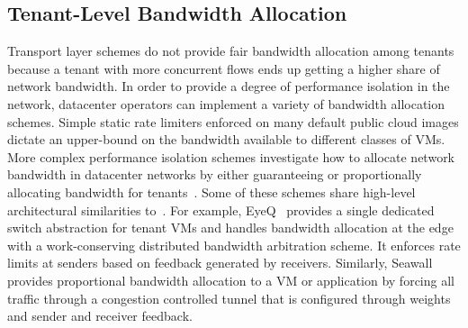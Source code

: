 \subsection{Tenant-Level Bandwidth Allocation}
Transport layer schemes do not
provide fair bandwidth allocation among tenants because
a tenant with more concurrent flows ends up getting
a higher share of network bandwidth.
In order to provide a degree of performance isolation in the network, datacenter operators can implement
a variety of bandwidth allocation schemes. 
Simple static rate limiters enforced on many default public cloud images dictate an upper-bound on the bandwidth available
to different classes of VMs.
More complex performance isolation schemes investigate how to allocate network bandwidth in datacenter
networks by either guaranteeing or proportionally
allocating bandwidth for tenants~\cite{rodrigues2011gatekeeper,Ballani2011oktopus,jeyakumar2013eyeq,shieh2011sharing,
Guo2010Secondnet,Popa2012Faircloud,Xie2012Proteus,Lam2012NetShare,jang2015silo}. 
Some of these schemes share high-level architectural similarities to~\acdc{}. For example, EyeQ~\cite{jeyakumar2013eyeq} provides a
single dedicated switch abstraction for tenant VMs and handles bandwidth allocation at
the edge with a work-conserving distributed bandwidth arbitration scheme. It enforces
rate limits at senders based on feedback generated by receivers. Similarly, Seawall~\cite{shieh2011sharing}
provides proportional bandwidth allocation to a VM or application by forcing all
traffic through a congestion controlled tunnel that is configured through weights and sender
and receiver feedback.

